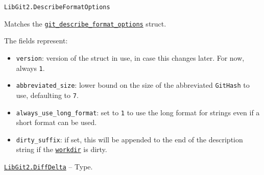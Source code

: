 \begin{adjustwidth}{2em}{0pt}


\begin{verbatim}
LibGit2.DescribeFormatOptions
\end{verbatim}

Matches the \href{https://libgit2.org/libgit2/\#HEAD/type/git\_describe\_format\_options}{\texttt{git\_describe\_format\_options}} struct.

The fields represent:

\begin{itemize}
\item \texttt{version}: version of the struct in use, in case this changes later. For now, always \texttt{1}.


\item \texttt{abbreviated\_size}: lower bound on the size of the abbreviated \texttt{GitHash} to use, defaulting to \texttt{7}.


\item \texttt{always\_use\_long\_format}: set to \texttt{1} to use the long format for strings even if a short format can be used.


\item \texttt{dirty\_suffix}: if set, this will be appended to the end of the description string if the \hyperlink{6689577338311178757}{\texttt{workdir}} is dirty.

\end{itemize}


\end{adjustwidth}
\hypertarget{9789233943804285928}{}
\hyperlink{9789233943804285928}{\texttt{LibGit2.DiffDelta}}  -- {Type.}

